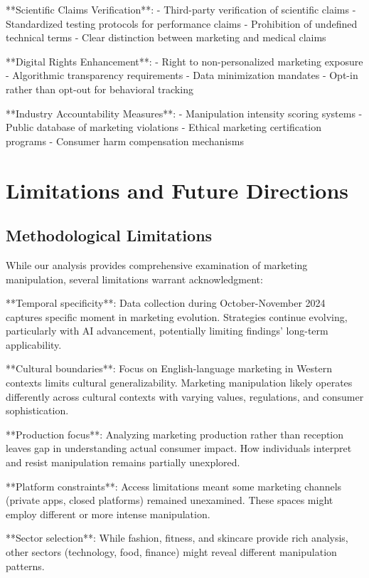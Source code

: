 **Scientific Claims Verification**:
- Third-party verification of scientific claims
- Standardized testing protocols for performance claims
- Prohibition of undefined technical terms
- Clear distinction between marketing and medical claims

**Digital Rights Enhancement**:
- Right to non-personalized marketing exposure
- Algorithmic transparency requirements
- Data minimization mandates
- Opt-in rather than opt-out for behavioral tracking

**Industry Accountability Measures**:
- Manipulation intensity scoring systems
- Public database of marketing violations
- Ethical marketing certification programs
- Consumer harm compensation mechanisms

\section{Limitations and Future Directions}
\label{sec:limitations_future}

\subsection{Methodological Limitations}

While our analysis provides comprehensive examination of marketing manipulation, several limitations warrant acknowledgment:

**Temporal specificity**: Data collection during October-November 2024 captures specific moment in marketing evolution. Strategies continue evolving, particularly with AI advancement, potentially limiting findings' long-term applicability.

**Cultural boundaries**: Focus on English-language marketing in Western contexts limits cultural generalizability. Marketing manipulation likely operates differently across cultural contexts with varying values, regulations, and consumer sophistication.

**Production focus**: Analyzing marketing production rather than reception leaves gap in understanding actual consumer impact. How individuals interpret and resist manipulation remains partially unexplored.

**Platform constraints**: Access limitations meant some marketing channels (private apps, closed platforms) remained unexamined. These spaces might employ different or more intense manipulation.

**Sector selection**: While fashion, fitness, and skincare provide rich analysis, other sectors (technology, food, finance) might reveal different manipulation patterns.

